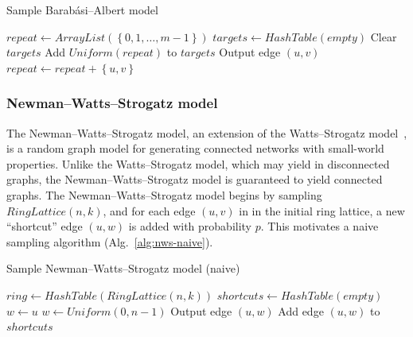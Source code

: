 \documentclass[a4paper,num-refs,gigabyte]{oup-contemporary}
\begin{document}
\begin{algorithm}[H]
\caption{Sample Barab\'asi--Albert model}
\label{alg:ba}
\begin{algorithmic}[1]
  \State $repeat\gets ArrayList\left(\left\{0,1,\ldots,m-1\right\}\right)$
  \State $targets\gets HashTable\left(empty\right)$
    \State Clear $targets$
      \State Add $Uniform\left(repeat\right)$ to $targets$
    \EndWhile
      \State Output edge $\left(u,v\right)$
      \State $repeat\gets repeat+\left\{u,v\right\}$
    \EndFor
  \EndFor
  \EndProcedure
\end{algorithmic}
\end{algorithm}

\subsubsection{Newman--Watts--Strogatz model}
The Newman--Watts--Strogatz model, an extension of the Watts--Strogatz model~\cite{Watts1998}, is a random graph model for generating connected networks with small-world properties. Unlike the Watts--Strogatz model, which may yield in disconnected graphs, the Newman--Watts--Strogatz model is guaranteed to yield connected graphs. The Newman--Watts--Strogatz model begins by sampling $RingLattice\left(n,k\right)$, and for each edge $\left(u,v\right)$ in in the initial ring lattice, a new ``shortcut'' edge $\left(u,w\right)$ is added with probability $p$. This motivates a naive sampling algorithm (Alg.~\ref{alg:nws-naive}).

\begin{algorithm}[H]
\caption{Sample Newman--Watts--Strogatz model (naive)}
\label{alg:nws-naive}
\begin{algorithmic}[1]
  \State $ring\gets HashTable\left( RingLattice\left(n,k\right)\right)$
  \State $shortcuts\gets HashTable\left(empty\right)$
      \State $w\gets u$
        \State $w\gets Uniform\left(0,n-1\right)$
      \EndWhile
      \State Output edge $\left(u,w\right)$
      \State Add edge $\left(u,w\right)$ to $shortcuts$
    \EndIf
  \EndFor
\EndProcedure
\end{algorithmic}
\end{algorithm}
\end{document}
